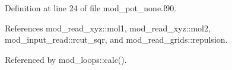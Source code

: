 Definition at line 24 of file mod\+\_\+pot\+\_\+none.\+f90.



References mod\+\_\+read\+\_\+xyz\+::mol1, mod\+\_\+read\+\_\+xyz\+::mol2, mod\+\_\+input\+\_\+read\+::rcut\+\_\+sqr, and mod\+\_\+read\+\_\+grids\+::repulsion.



Referenced by mod\+\_\+loops\+::calc().

